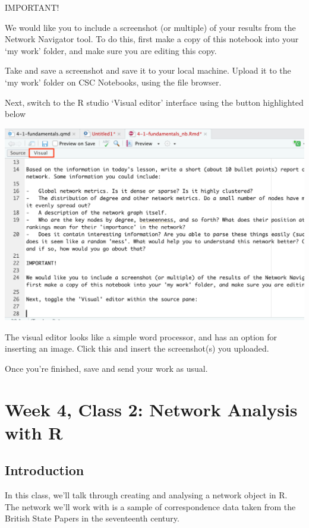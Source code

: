 \documentclass[
]{book}
\begin{document}
IMPORTANT!

We would like you to include a screenshot (or multiple) of your results from the Network Navigator tool. To do this, first make a copy of this notebook into your `my work' folder, and make sure you are editing this copy.

Take and save a screenshot and save it to your local machine. Upload it to the `my work' folder on CSC Notebooks, using the file browser.

Next, switch to the R studio `Visual editor' interface using the button highlighted below

\includegraphics{images/paste-B2759EF2.png}

The visual editor looks like a simple word processor, and has an option for inserting an image. Click this and insert the screenshot(s) you uploaded.

Once you're finished, save and send your work as usual.

\hypertarget{week-4-class-2-network-analysis-with-r}{%
\chapter{Week 4, Class 2: Network Analysis with R}\label{week-4-class-2-network-analysis-with-r}}

\hypertarget{introduction-3}{%
\section{Introduction}\label{introduction-3}}

In this class, we'll talk through creating and analysing a network object in R. The network we'll work with is a sample of correspondence data taken from the British State Papers in the seventeenth century.
\end{document}
